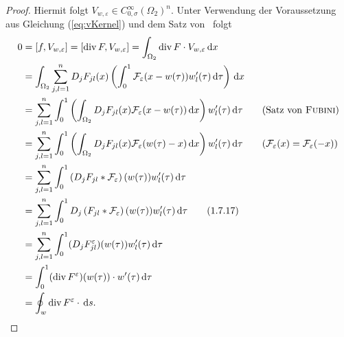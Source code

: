 \begin{proof}
  Hiermit folgt $V_{w,\varepsilon} \in C_{0,\sigma}^\infty(\Omega_2)^n$.
  Unter Verwendung der Voraussetzung aus Gleichung (\ref{eq:vKernel}) und dem Satz von \fubini\ folgt
  \begingroup
  \addtolength{\jot}{1em}
  \begin{align*}
    0
    &= [f, V_{w, \varepsilon}] %
    = [\div F, V_{w, \varepsilon}] %
    = \int_{\Omega_2} \div F \cdot V_{w, \varepsilon} \d x \\
    &= \int_{\Omega_2} \sum_{j,l=1}^n D_j F_{jl}(x) \left( \int_0^1 \mathcal{F}_\varepsilon(x - w(\tau))w_l'(\tau) \d\tau \right) \d x \\
    &= \sum_{j,l=1}^n \int_0^1 \left(\int_{\Omega_2}  D_j F_{jl}(x) \mathcal{F}_\varepsilon(x - w(\tau))\d x \right) w_l'(\tau) \d\tau \tag{Satz von \fubini}\\
    &= \sum_{j,l=1}^n \int_0^1 \left(\int_{\Omega_2}  D_j F_{jl}(x) \mathcal{F}_\varepsilon(w(\tau) - x)\d x \right) w_l'(\tau) \d\tau \tag{$\mathcal{F}_\varepsilon(x) = \mathcal{F}_\varepsilon(-x)$}\\
    &= \sum_{j,l=1}^n \int_0^1 \left(D_j F_{jl} \ast \mathcal{F}_\varepsilon\right)(w(\tau)) w_l'(\tau) \d\tau \\
    &= \sum_{j,l=1}^n \int_0^1 D_j\left(F_{jl} \ast \mathcal{F}_\varepsilon\right)(w(\tau)) w_l'(\tau) \d\tau \tag{1.7.17}\\
    &= \sum_{j,l=1}^n \int_0^1 (D_j F_{jl}^\varepsilon)(w(\tau)) w_l'(\tau) \d\tau \\
    &= \int_0^1 (\div F^\varepsilon)(w(\tau)) \cdot w'(\tau) \d\tau \\
    &= \oint_w \div F^\varepsilon \cdot \d s.
  \end{align*}
  \endgroup


\end{proof}
